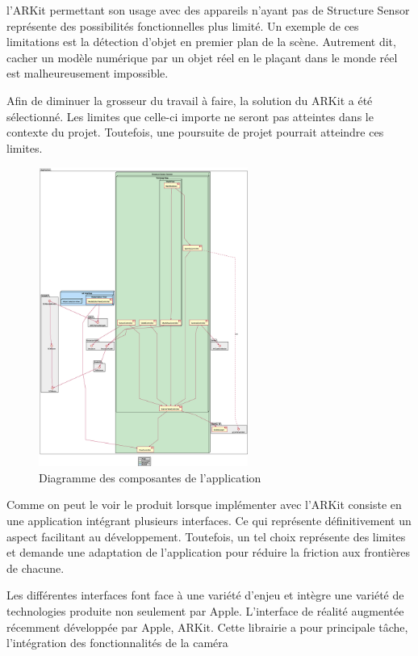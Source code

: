 \documentclass[letterpaper,twoside,12pt,french]{report}
\begin{document}
l'ARKit permettant son usage avec des appareils n'ayant pas de Structure Sensor représente des
possibilités fonctionnelles plus limité. Un exemple de ces limitations est la détection d'objet
en premier plan de la scène. Autrement dit, cacher un modèle numérique par un objet réel en le
plaçant dans le monde réel est malheureusement impossible.
\par
Afin de diminuer la grosseur du travail à faire, la solution du ARKit a été sélectionné. Les
limites que celle-ci importe ne seront pas atteintes dans le contexte du projet. Toutefois, une
poursuite de projet pourrait atteindre ces limites.
\begin{figure}[H]
    \includegraphics[width=0.61\textwidth]{project-architecture.eps}
\centering
    \caption{Diagramme des composantes de l'application}
\end{figure}
\par
Comme on peut le voir le produit lorsque implémenter avec l'ARKit consiste en une application
intégrant plusieurs interfaces. Ce qui représente définitivement un aspect facilitant au
développement. Toutefois, un tel choix représente des limites et demande une adaptation de
l'application pour réduire la friction aux frontières de chacune.
\par
Les différentes interfaces font face à une variété d'enjeu et intègre une variété de technologies
produite non seulement par Apple. L'interface de réalité augmentée récemment développée par Apple,
ARKit. Cette librairie a pour principale tâche, l'intégration des fonctionnalités de la caméra
\end{document}
